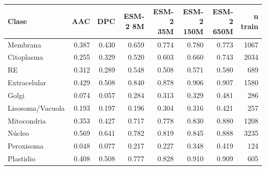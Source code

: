 \begin{tabular}{lrrrrrrr}
\toprule
Clase & AAC & DPC & ESM-2 8M & ESM-2 35M & ESM-2 150M & ESM-2 650M & n train \\
\midrule
Membrana & 0.387 & 0.430 & 0.659 & 0.774 & 0.780 & 0.773 & 1067 \\
Citoplasma & 0.255 & 0.329 & 0.520 & 0.603 & 0.660 & 0.743 & 2034 \\
RE & 0.312 & 0.289 & 0.548 & 0.508 & 0.571 & 0.580 & 689 \\
Extracelular & 0.429 & 0.508 & 0.840 & 0.878 & 0.906 & 0.907 & 1580 \\
Golgi & 0.074 & 0.057 & 0.284 & 0.313 & 0.329 & 0.481 & 286 \\
Lisosoma/Vacuola & 0.193 & 0.197 & 0.196 & 0.304 & 0.316 & 0.421 & 257 \\
Mitocondria & 0.353 & 0.427 & 0.717 & 0.778 & 0.830 & 0.880 & 1208 \\
Núcleo & 0.569 & 0.641 & 0.782 & 0.819 & 0.845 & 0.888 & 3235 \\
Peroxisoma & 0.048 & 0.077 & 0.217 & 0.227 & 0.348 & 0.419 & 124 \\
Plastidio & 0.408 & 0.508 & 0.777 & 0.828 & 0.910 & 0.909 & 605 \\
\bottomrule
\end{tabular}
